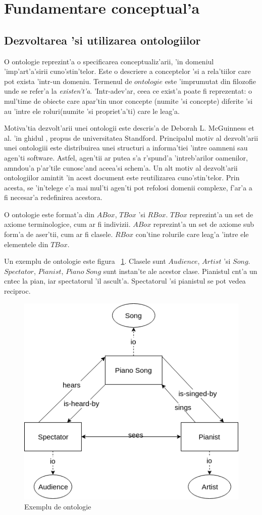 \documentclass[12pt,a4paper,twoside]{report}
\begin{document}
\section{Fundamentare conceptual'a}
\subsection{Dezvoltarea 'si utilizarea ontologiilor}


O ontologie reprezint'a o specificarea  conceptualiz'arii, 'in domeniul 'imp'art'a'sirii cuno'stin'telor. Este o descriere a conceptelor 'si a rela'tiilor care pot exista 'intr-un domeniu. Termenul de $ontologie$ este 'imprumutat din filozofie unde se refer'a la {\it existen't'a}. 'Intr-adev'ar, ceea ce exist'a poate fi reprezentat: o mul'time de obiecte care apar'tin unor concepte (numite 'si concepte) diferite 'si au 'intre ele roluri(numite 'si propriet'a'ti) care le leag'a.

Motiva'tia dezvolt'arii unei ontologii este descris'a de Deborah L. McGuinness et al. 'in ghidul \cite{protege_ontology}, propus de universitatea Standford. Principalul motiv al dezvolt'arii unei ontologiii este distribuirea unei structuri a informa'tiei 'intre oamneni sau agen'ti software. Astfel, agen'tii ar putea s'a r'spund'a 'intreb'arilor oamenilor, am\ia ndou'a p'ar'tile cunosc'and aceea'si schem'a. Un alt motiv al dezvolt'arii ontologiilor amintit 'in acest document este reutilizarea cuno'stin'telor. Prin acesta, se 'in'telege c'a mai mul'ti agen'ti pot refolosi domenii complexe, f'ar'a a fi necesar'a redefinirea acestora. 

O ontologie este format'a din $ABox$, $TBox$  'si $RBox$. $TBox$ reprezint'a un set de axiome terminologice, cum ar fi indivizii. $ABox$ reprezint'a un set de axiome sub form'a de aser'tii, cum ar fi clasele. $RBox$ con'tine rolurile care leag'a 'intre ele elementele din $TBox$. 

Un exemplu de ontologie este figura ~\ref{fig:onto_ex}. Clasele sunt $Audience$, $Artist$ 'si $Song$. $Spectator$, $Pianist$, $Piano\ Song$  sunt instan'te ale acestor clase. Pianistul c\ia nt'a un c\ia ntec la pian, iar spectatorul 'il ascult'a. Spectatorul 'si pianistul se pot vedea reciproc.

\begin{figure}
    \centering
    \includegraphics[width = 0.6\linewidth]{img/onto_example.png}
        \caption{Exemplu de ontologie}
    \label{fig:onto_ex}
\end{figure}
\end{document}
